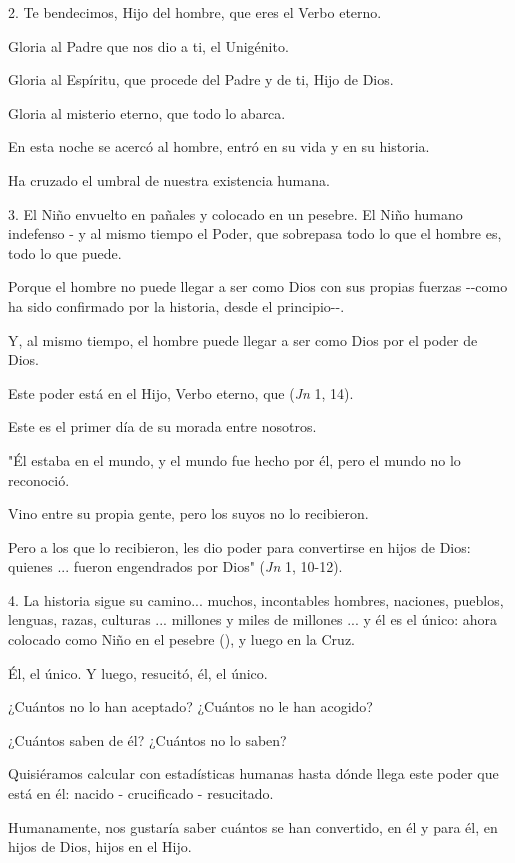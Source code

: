 \begin{body}
\begin{body}
		2. Te bendecimos, Hijo del hombre, que eres el Verbo eterno.
		
		Gloria al Padre que nos dio a ti, el Unigénito.
		
		Gloria al Espíritu, que procede del Padre y de ti, Hijo de Dios.
		
		Gloria al misterio eterno, que todo lo abarca.
		
		En esta noche se acercó al hombre, entró en su vida y en su historia.
		
		Ha cruzado el umbral de nuestra existencia humana.
		
		3. El Niño envuelto en pañales y colocado en un pesebre. El Niño humano indefenso - y al mismo tiempo el Poder, que sobrepasa todo lo que el hombre es, todo lo que puede.
		
		Porque el hombre no puede llegar a ser como Dios con sus propias fuerzas -\/-como ha sido confirmado por la historia, desde el principio-\/-.
		
		Y, al mismo tiempo, el hombre puede llegar a ser como Dios por el poder de Dios.
		
		Este poder está en el Hijo, Verbo eterno, que  (\emph{Jn} 1, 14).
		
		Este es el primer día de su morada entre nosotros.
		
		"Él estaba en el mundo, y el mundo fue hecho por él, pero el mundo no lo reconoció.
		
		Vino entre su propia gente, pero los suyos no lo recibieron.
		
		Pero a los que lo recibieron, les dio poder para convertirse en hijos de Dios: quienes ... fueron engendrados por Dios" (\emph{Jn} 1, 10-12).
		
		4. La historia sigue su camino... muchos, incontables hombres, naciones, pueblos, lenguas, razas, culturas ... millones y miles de millones ... y él es el único: ahora colocado como Niño en el pesebre (), y luego en la Cruz.
		
		Él, el único. Y luego, resucitó, él, el único.
		
		¿Cuántos no lo han aceptado? ¿Cuántos no le han acogido?
		
		¿Cuántos saben de él? ¿Cuántos no lo saben?
		
		Quisiéramos calcular con estadísticas humanas hasta dónde llega este poder que está en él: nacido - crucificado - resucitado.
		
		Humanamente, nos gustaría saber cuántos se han convertido, en él y para él, en hijos de Dios, hijos en el Hijo.
		

\end{body}
\end{body}
